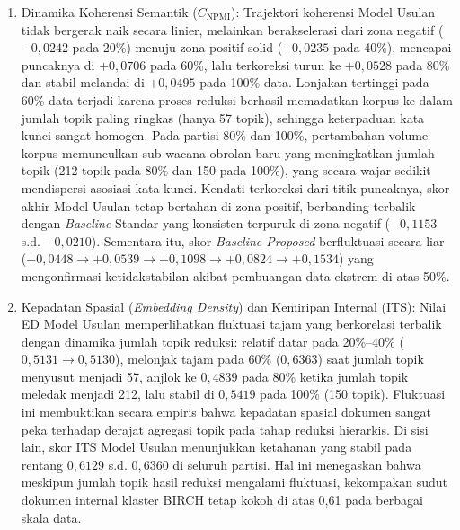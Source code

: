 \begin{enumerate}[label=\alph*., leftmargin=*, itemsep=4pt]
    \item Dinamika Koherensi Semantik ($C_{\text{NPMI}}$):
    Trajektori koherensi Model Usulan tidak bergerak naik secara linier, melainkan berakselerasi dari zona negatif ($-0{,}0242$ pada 20\%) menuju zona positif solid ($+0{,}0235$ pada 40\%), mencapai puncaknya di $+0{,}0706$ pada 60\%, lalu terkoreksi turun ke $+0{,}0528$ pada 80\% dan stabil melandai di $+0{,}0495$ pada 100\% data. Lonjakan tertinggi pada 60\% data terjadi karena proses reduksi berhasil memadatkan korpus ke dalam jumlah topik paling ringkas (hanya 57 topik), sehingga keterpaduan kata kunci sangat homogen. Pada partisi 80\% dan 100\%, pertambahan volume korpus memunculkan sub-wacana obrolan baru yang meningkatkan jumlah topik (212 topik pada 80\% dan 150 pada 100\%), yang secara wajar sedikit mendispersi asosiasi kata kunci. Kendati terkoreksi dari titik puncaknya, skor akhir Model Usulan tetap bertahan di zona positif, berbanding terbalik dengan \textit{Baseline} Standar yang konsisten terpuruk di zona negatif ($-0{,}1153$ s.d. $-0{,}0210$). Sementara itu, skor \textit{Baseline Proposed} berfluktuasi secara liar ($+0{,}0448 \rightarrow +0{,}0539 \rightarrow +0{,}1098 \rightarrow +0{,}0824 \rightarrow +0{,}1534$) yang mengonfirmasi ketidakstabilan akibat pembuangan data ekstrem di atas 50\%.

    \item Kepadatan Spasial (\textit{Embedding Density}) dan Kemiripan Internal (ITS):
    Nilai ED Model Usulan memperlihatkan fluktuasi tajam yang berkorelasi terbalik dengan dinamika jumlah topik reduksi: relatif datar pada 20\%--40\% ($0{,}5131 \rightarrow 0{,}5130$), melonjak tajam pada 60\% ($0{,}6363$) saat jumlah topik menyusut menjadi 57, anjlok ke $0{,}4839$ pada 80\% ketika jumlah topik meledak menjadi 212, lalu stabil di $0{,}5419$ pada 100\% (150 topik). Fluktuasi ini membuktikan secara empiris bahwa kepadatan spasial dokumen sangat peka terhadap derajat agregasi topik pada tahap reduksi hierarkis. Di sisi lain, skor ITS Model Usulan menunjukkan ketahanan yang stabil pada rentang $0{,}6129$ s.d. $0{,}6360$ di seluruh partisi. Hal ini menegaskan bahwa meskipun jumlah topik hasil reduksi mengalami fluktuasi, kekompakan sudut dokumen internal klaster BIRCH tetap kokoh di atas 0,61 pada berbagai skala data.


\end{enumerate}
